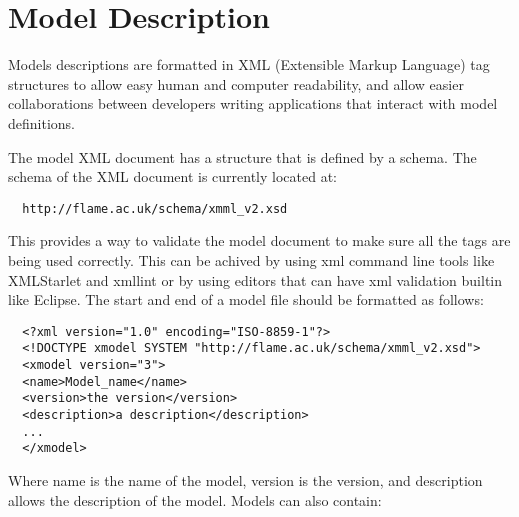 \section{Model Description}
\label{sec:model_description}

Models descriptions are formatted in XML (Extensible Markup Language) tag
structures to allow easy human and computer readability, and allow easier collaborations between
developers writing applications that interact with model definitions.

The model XML document has a structure that is defined by a schema.
The schema of the XML document is currently located
at:

\begin{verbatim}
  http://flame.ac.uk/schema/xmml_v2.xsd
\end{verbatim}

This provides a way to validate the model document to make sure all the tags are
being used correctly. This can be achived by using xml command line tools like
XMLStarlet and xmllint or by using editors that
can have xml validation builtin like Eclipse. The start and end
of a model file should be formatted as follows:

\begin{verbatim}
  <?xml version="1.0" encoding="ISO-8859-1"?>
  <!DOCTYPE xmodel SYSTEM "http://flame.ac.uk/schema/xmml_v2.xsd">
  <xmodel version="3">
  <name>Model_name</name>
  <version>the version</version>
  <description>a description</description>
  ...
  </xmodel>
\end{verbatim}

Where name is the name of the model, version is the version, and description
allows the description of the model. Models can also contain:

